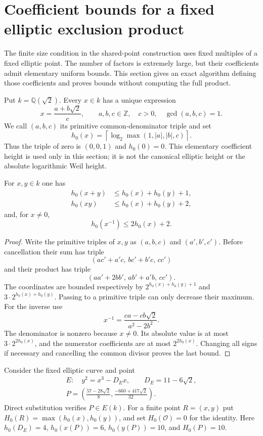 \section{Coefficient bounds for a fixed elliptic exclusion product}
\label{sec:fixed-anchor-height}

The finite size condition in the shared-point construction uses fixed
multiples of a fixed elliptic point.  The number of factors is extremely
large, but their coefficients admit elementary uniform bounds.  This
section gives an exact algorithm defining those coefficients and proves
bounds without computing the full product.

Put $k=\mathbb Q(\sqrt2)$.  Every $x\in k$ has a unique expression
\[
 x=\frac{a+b\sqrt2}{c},\qquad
 a,b,c\in\mathbb Z,\quad c>0,\quad \gcd(a,b,c)=1.
\]
We call $(a,b,c)$ its primitive common-denominator triple and set
\[
 h_0(x)=\left\lceil\log_2\max(1,|a|,|b|,c)\right\rceil.
\]
Thus the triple of zero is $(0,0,1)$ and $h_0(0)=0$.  This elementary
coefficient height is used only in this section; it is not the canonical
elliptic height or the absolute logarithmic Weil height.

\begin{lemma}\label{lem:fixed-triple-height}
For $x,y\in k$ one has
\[
 \begin{aligned}
 h_0(x+y)&\le h_0(x)+h_0(y)+1,\\
 h_0(xy)&\le h_0(x)+h_0(y)+2,
 \end{aligned}
\]
and, for $x\ne0$,
\[
                         h_0(x^{-1})\le2h_0(x)+2.
\]
\end{lemma}
\begin{proof}
Write the primitive triples of $x,y$ as $(a,b,c)$ and
$(a',b',c')$.  Before cancellation their sum has triple
\[
 (ac'+a'c,\,bc'+b'c,\,cc')
\]
and their product has triple
\[
 (aa'+2bb',\,ab'+a'b,\,cc').
\]
The coordinates are bounded respectively by
$2^{h_0(x)+h_0(y)+1}$ and $3\cdot2^{h_0(x)+h_0(y)}$.
Passing to a primitive triple can only decrease their maximum.  For
the inverse use
\[
                  x^{-1}=\frac{ca-cb\sqrt2}{a^2-2b^2}.
\]
The denominator is nonzero because $x\ne0$.  Its absolute value is
at most $3\cdot2^{2h_0(x)}$, and the numerator coefficients are at
most $2^{2h_0(x)}$.  Changing all signs if necessary and cancelling
the common divisor proves the last bound.
\end{proof}

Consider the fixed elliptic curve and point
\[
 \begin{gathered}
 E:\quad y^2=x^3-D_E x,\qquad D_E=11-6\sqrt2,\\
 P=\left(\frac{57-28\sqrt2}{8},
          \frac{-660+417\sqrt2}{32}\right).
 \end{gathered}
\]
Direct substitution verifies $P\in E(k)$.  For a finite point
$R=(x,y)$ put $H_0(R)=\max(h_0(x),h_0(y))$, and set
$H_0(\mathcal O)=0$ for the identity.  Here $h_0(D_E)=4$,
$h_0(x(P))=6$, $h_0(y(P))=10$, and $H_0(P)=10$.


